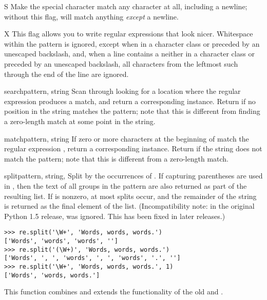 \begin{datadesc}{S}
Make the  special character match any character at all, including a
newline; without this flag,  will match anything \emph{except}
a newline.
\end{datadesc}

\begin{datadesc}{X}
This flag allows you to write regular expressions that look nicer.
Whitespace within the pattern is ignored, 
except when in a character class or preceded by an unescaped
backslash, and, when a line contains a \character{\#} neither in a character
class or preceded by an unescaped backslash, all characters from the
leftmost such \character{\#} through the end of the line are ignored.
\end{datadesc}


\begin{funcdesc}{search}{pattern, string}
  Scan through  looking for a location where the regular
  expression  produces a match, and return a
  corresponding  instance.
  Return  if no
  position in the string matches the pattern; note that this is
  different from finding a zero-length match at some point in the string.
\end{funcdesc}

\begin{funcdesc}{match}{pattern, string}
  If zero or more characters at the beginning of  match
  the regular expression , return a corresponding
   instance.  Return  if the string does not
  match the pattern; note that this is different from a zero-length
  match.
\end{funcdesc}

\begin{funcdesc}{split}{pattern, string, }
  Split  by the occurrences of .  If
  capturing parentheses are used in , then the text of all
  groups in the pattern are also returned as part of the resulting list.
  If  is nonzero, at most  splits
  occur, and the remainder of the string is returned as the final
  element of the list.  (Incompatibility note: in the original Python
  1.5 release,  was ignored.  This has been fixed in
  later releases.)
%
\begin{verbatim}
>>> re.split('\W+', 'Words, words, words.')
['Words', 'words', 'words', '']
>>> re.split('(\W+)', 'Words, words, words.')
['Words', ', ', 'words', ', ', 'words', '.', '']
>>> re.split('\W+', 'Words, words, words.', 1)
['Words', 'words, words.']
\end{verbatim}
%
  This function combines and extends the functionality of
  the old  and .
\end{funcdesc}


